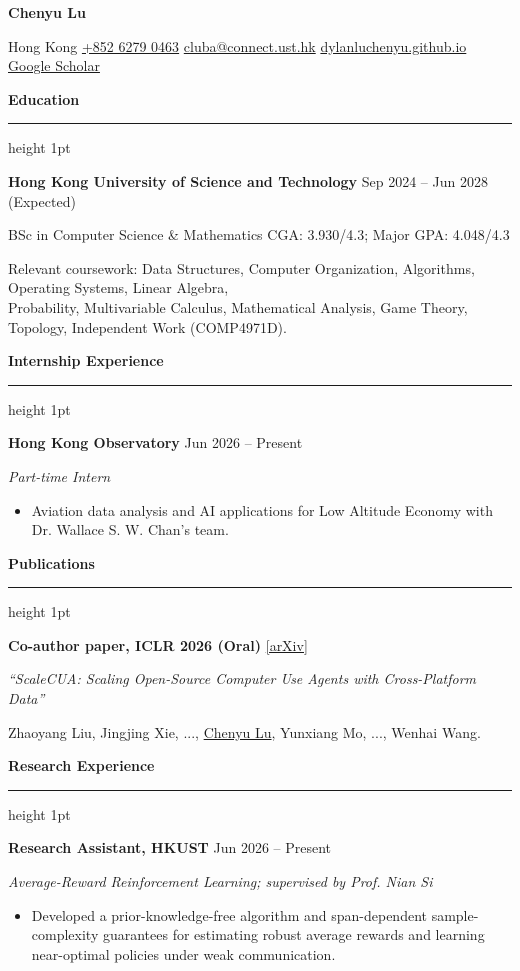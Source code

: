 \documentclass[a4paper,10pt]{article}
\newcommand{\cvsection}[1]{%
  \par\Needspace{3\baselineskip}\vspace{4pt}%
  {\color{cvblue}\textbf{\normalsize #1}}%
  \par\vspace{2pt}%
  {\color{cvblue}\hrule height 1pt}%
  \vspace{2pt}%
}
\newcommand{\cvitem}[1]{\item #1}
\begin{document}
{\Large\bfseries Chenyu Lu}\par
\vspace{2pt}
Hong Kong \quad
\href{tel:+85262790463}{+852 6279 0463} \quad
\href{mailto:cluba@connect.ust.hk}{cluba@connect.ust.hk} \quad
\href{https://dylanluchenyu.github.io}{dylanluchenyu.github.io} \quad
\href{https://scholar.google.com/citations?hl=en\&user=TvHmvtEAAAAJ}{Google Scholar}\par

\cvsection{Education}
\textbf{Hong Kong University of Science and Technology}
\hfill {\color{cvblue}Sep 2024 -- Jun 2028 (Expected)}\par
BSc in Computer Science \& Mathematics \hfill CGA: 3.930/4.3; Major GPA: 4.048/4.3\par
Relevant coursework: Data Structures, Computer Organization, Algorithms, Operating Systems,
Linear Algebra,\\
Probability, Multivariable Calculus, Mathematical Analysis, Game Theory,
Topology, Independent Work (COMP4971D).

\cvsection{Internship Experience}
\textbf{Hong Kong Observatory}
\hfill {\color{cvblue}Jun 2026 -- Present}\par
\textit{Part-time Intern}
\begin{itemize}[leftmargin=1.3em, topsep=1pt, itemsep=1pt, parsep=0pt]
  \cvitem{Aviation data analysis and AI applications for Low Altitude Economy with Dr. Wallace S. W. Chan's team.}
\end{itemize}

\cvsection{Publications}
\textbf{Co-author paper, ICLR 2026 (Oral)}
\href{https://arxiv.org/abs/2509.15221}{[arXiv]}\par
\textit{``ScaleCUA: Scaling Open-Source Computer Use Agents with Cross-Platform Data''}\par
Zhaoyang Liu, Jingjing Xie, ..., \underline{Chenyu Lu}, Yunxiang Mo, ..., Wenhai Wang.

\cvsection{Research Experience}
\textbf{Research Assistant, HKUST}
\hfill {\color{cvblue}Jun 2026 -- Present}\par
\textit{Average-Reward Reinforcement Learning; supervised by Prof. Nian Si}\par
\begin{itemize}[leftmargin=1.3em, topsep=1pt, itemsep=1pt, parsep=0pt]
  \cvitem{\raggedright Developed a prior-knowledge-free algorithm and span-dependent sample-complexity guarantees for estimating robust average rewards and learning near-optimal policies under weak communication.}
\end{itemize}
\end{document}
